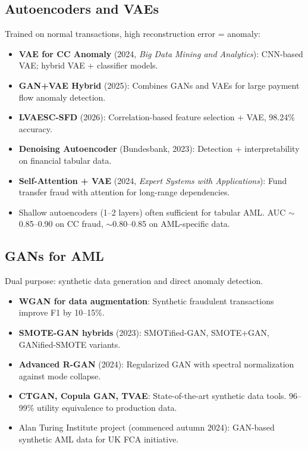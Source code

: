 \documentclass[11pt]{article}
\begin{document}
\subsection{Autoencoders and VAEs}

Trained on normal transactions, high reconstruction error = anomaly:

\begin{itemize}
\item \textbf{VAE for CC Anomaly} (2024, \textit{Big Data Mining and Analytics}): CNN-based VAE; hybrid VAE + classifier models.
\item \textbf{GAN+VAE Hybrid} (2025): Combines GANs and VAEs for large payment flow anomaly detection.
\item \textbf{LVAESC-SFD} (2026): Correlation-based feature selection + VAE, 98.24\% accuracy.
\item \textbf{Denoising Autoencoder} (Bundesbank, 2023): Detection + interpretability on financial tabular data.
\item \textbf{Self-Attention + VAE} (2024, \textit{Expert Systems with Applications}): Fund transfer fraud with attention for long-range dependencies.
\item Shallow autoencoders (1--2 layers) often sufficient for tabular AML. AUC $\sim$0.85--0.90 on CC fraud, $\sim$0.80--0.85 on AML-specific data.
\end{itemize}

\subsection{GANs for AML}

Dual purpose: synthetic data generation and direct anomaly detection.

\begin{itemize}
\item \textbf{WGAN for data augmentation}: Synthetic fraudulent transactions improve F1 by 10--15\%.
\item \textbf{SMOTE-GAN hybrids} (2023): SMOTified-GAN, SMOTE+GAN, GANified-SMOTE variants.
\item \textbf{Advanced R-GAN} (2024): Regularized GAN with spectral normalization against mode collapse.
\item \textbf{CTGAN, Copula GAN, TVAE}: State-of-the-art synthetic data tools. 96--99\% utility equivalence to production data.
\item Alan Turing Institute project (commenced autumn 2024): GAN-based synthetic AML data for UK FCA initiative.
\end{itemize}
\end{document}
